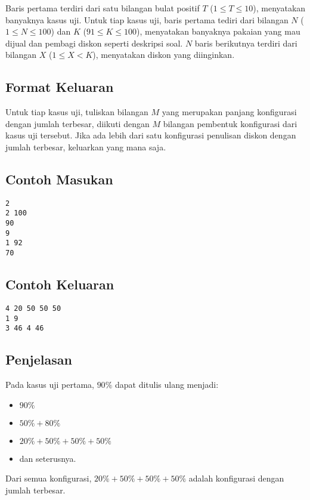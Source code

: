 \documentclass{article}
\begin{document}
Baris pertama terdiri dari satu bilangan bulat positif $T$ ($1 \leq T \leq 10$), menyatakan banyaknya kasus uji.
Untuk tiap kasus uji, baris pertama tediri dari bilangan $N$ ($1 \leq N \leq 100$) dan $K$ ($91 \leq K \leq 100$), menyatakan banyaknya pakaian yang mau dijual dan pembagi diskon seperti deskripsi soal.
$N$ baris berikutnya terdiri dari bilangan $X$ ($1 \leq X < K$), menyatakan diskon yang diinginkan.

\subsection*{Format Keluaran}

Untuk tiap kasus uji, tuliskan bilangan $M$ yang merupakan panjang konfigurasi dengan jumlah terbesar, diikuti dengan $M$ bilangan pembentuk konfigurasi dari kasus uji tersebut.
Jika ada lebih dari satu konfigurasi penulisan diskon dengan jumlah terbesar, keluarkan yang mana saja.
\\

\begin{multicols}{2}
\subsection*{Contoh Masukan}
\begin{lstlisting}
2
2 100
90
9
1 92
70
\end{lstlisting}
\columnbreak
\subsection*{Contoh Keluaran}
\begin{lstlisting}
4 20 50 50 50
1 9
3 46 4 46
\end{lstlisting}
\vfill
\null
\end{multicols}

\pagebreak
\subsection*{Penjelasan}
Pada kasus uji pertama, $90\%$ dapat ditulis ulang menjadi:

\begin{itemize}
    \setlength\itemsep{0pt}
    \item $90\%$
    \item $50\% + 80\%$
    \item $20\% + 50\% + 50\% + 50\%$
    \item dan seterusnya.
\end{itemize}

Dari semua konfigurasi, $20\% + 50\% + 50\% + 50\%$ adalah konfigurasi dengan jumlah terbesar.

\pagebreak
\end{document}
